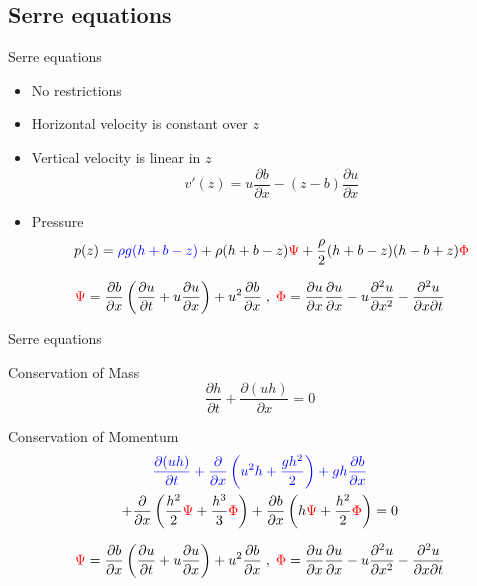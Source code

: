 \documentclass[pdf]{beamer}
\begin{document}

\subsection{Serre equations}
\begin{frame}{Serre equations}
		\begin{itemize}
			\item No restrictions
			\smallskip
			\item Horizontal velocity is constant over $z$
			\item Vertical velocity is linear in $z$
						 $$v'(z) = u\frac{\partial b}{\partial x} - (z - b)\frac{\partial u}{\partial x}$$
		    \item Pressure
		    $$p(z) = {\color{blue} \rho g(h + b - z)} + \rho(h + b - z)  {\color{red} \Psi }  + \frac{\rho}{2}(h+b - z)(h - b + z) {\color{red} \Phi } $$
			\end{itemize}
		\[ {\color{red} \Psi }  = \dfrac{\partial b}{\partial x}\left(\dfrac{\partial u}{\partial t} + u\dfrac{\partial u}{\partial x} \right)  + u^2\dfrac{\partial b}{\partial x} \;, \; 
		{\color{red} \Phi }  = \dfrac{\partial u }{\partial x} \dfrac{\partial u}{\partial x} -u \dfrac{\partial^2 u}{\partial x^2}  - \dfrac{\partial^2 u}{\partial x \partial t}  \]
\end{frame}

\begin{frame}{Serre equations}
	
	    Conservation of Mass
	    \[
		\dfrac{\partial h}{\partial t} + \dfrac{\partial (uh)}{\partial x} = 0
		\]

		Conservation of Momentum
		\begin{multline*}
				{\color{blue} \dfrac{\partial (uh)}{\partial t} + \dfrac{\partial}{\partial x} \left ( u^2h + \dfrac{gh^2}{2}\right ) + gh \frac{\partial b}{\partial x}}  \\+ \dfrac{\partial}{\partial x} \left ( \dfrac{h^2}{2}{\color{red} \Psi} + \dfrac{h^3}{3}{\color{red} \Phi }   \right ) + \dfrac{\partial b}{\partial x} \left (  h{\color{red} \Psi} + \dfrac{h^2}{2}{\color{red} \Phi }  \right ) = 0
		\end{multline*}
		
		\[ {\color{red} \Psi }  = \dfrac{\partial b}{\partial x}\left(\dfrac{\partial u}{\partial t} + u\dfrac{\partial u}{\partial x} \right)  + u^2\dfrac{\partial b}{\partial x} \;, \; 
		{\color{red} \Phi }  = \dfrac{\partial u }{\partial x} \dfrac{\partial u}{\partial x} -u \dfrac{\partial^2 u}{\partial x^2}  - \dfrac{\partial^2 u}{\partial x \partial t}  \]
\end{frame}
\end{document}
